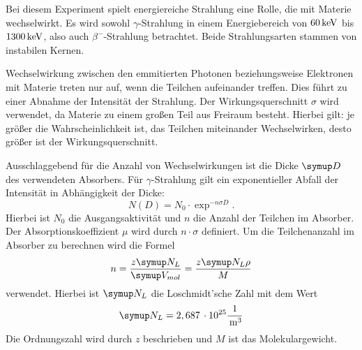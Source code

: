 Bei diesem Experiment spielt energiereiche Strahlung eine Rolle, die mit Materie
wechselwirkt. Es wird sowohl $\gamma$-Strahlung in einem Energiebereich von
$60\,\si{\kilo\electronvolt}$ bis $1300\,\si{\kilo\electronvolt}$, also auch $\beta^{-}$-Strahlung betrachtet. Beide
Strahlungsarten stammen von instabilen Kernen.

Wechselwirkung zwischen den emmitierten Photonen beziehungsweise Elektronen mit
Materie treten nur auf, wenn die Teilchen aufeinander treffen. Dies führt zu einer
Abnahme der Intensität der Strahlung.
Der Wirkungsquerschnitt $\sigma$ wird verwendet, da Materie zu einem großen Teil
aus Freiraum besteht. Hierbei gilt: je größer die Wahrscheinlichkeit ist, das
Teilchen miteinander Wechselwirken, desto größer ist der Wirkungsquerschnitt.

Ausschlaggebend für die Anzahl von Wechselwirkungen ist die Dicke $\su{D}$ des
verwendeten Absorbers. Für $\gamma$-Strahlung gilt ein exponentieller Abfall der
Intensität in Abhängigkeit der Dicke:
\begin{equation}
  N(D) = N_0 \cdot \exp^{-n\sigma D}.
  \label{eqn:steig}
\end{equation}
Hierbei ist $N_0$ die Ausgangsaktivität und $n$ die Anzahl der Teilchen im Absorber.
Der Absorptionskoeffizient $\mu$ wird durch $n\cdot\sigma$ definiert. Um die
Teilchenanzahl im Absorber zu berechnen wird die Formel
\begin{equation}
  n = \frac{z\su{N_L}}{\su{V_{mol}}} = \frac{z\su{N_L}\rho}{M}
\end{equation}
verwendet. Hierbei ist $\su{N_L}$ die Loschmidt'sche Zahl\cite{los} mit dem Wert
\begin{equation*}
  \su{N_L} = 2,687\,\cdot10^{25}\frac{1}{\mt^3}
\end{equation*}
Die Ordnungszahl wird durch $z$ beschrieben
und $M$ ist das Molekulargewicht.

